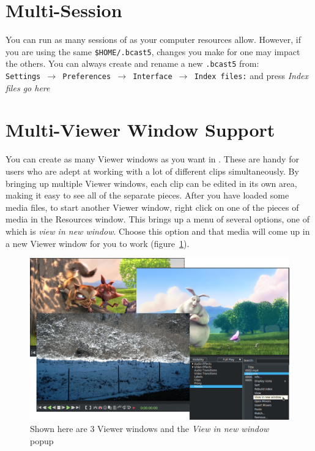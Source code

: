 \section{Multi-Session}%
\label{sec:multi_session}

You can run as many sessions of \CGG{} as your computer resources allow.  However, if you are using the same \texttt{\$HOME/.bcast5}, changes you make for one may impact the others. You can always create and rename a new \texttt{.bcast5} from:\\
\texttt{Settings $\rightarrow$ Preferences $\rightarrow$ Interface $\rightarrow$ Index files:} and press \textit{Index files go here}

\section{Multi-Viewer Window Support}%
\label{sec:multi_viewer_window_support}

You can create as many Viewer windows as you want in \CGG{}.  These are handy for users who are adept at working with a lot of different clips simultaneously.  By bringing up multiple Viewer windows, each clip can be edited in its own area, making it easy to see all of the separate pieces.  After you have loaded some media files, to start another Viewer window, right click on one of the pieces of media in the Resources window.  This brings up a menu of several options, one of which is \textit{view in new window}.  Choose this option and that media will come up in a new Viewer window for you to work (figure~\ref{fig:multi-view01}).

\begin{figure}[htpb]
    \centering
    \includegraphics[width=0.9\linewidth]{images/multi-view01.png}
    \caption{Shown here are 3 Viewer windows and the \textit{View in new window} popup}
    \label{fig:multi-view01}
\end{figure}

